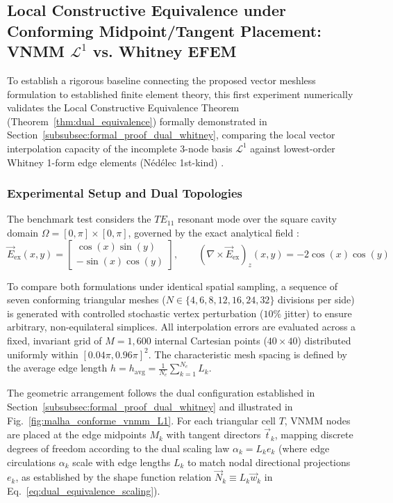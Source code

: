 \documentclass[preprint,12pt]{elsarticle}
\begin{document}
\subsection{Local Constructive Equivalence under Conforming Midpoint/Tangent Placement: VNMM \texorpdfstring{$\mathcal{L}^1$}{L1} vs. Whitney EFEM}
\label{subsec:conforming_dual_equivalence}

To establish a rigorous baseline connecting the proposed vector meshless formulation to established finite element theory, this first experiment numerically validates the Local Constructive Equivalence Theorem (Theorem~\ref{thm:dual_equivalence}) formally demonstrated in Section~\ref{subsubsec:formal_proof_dual_whitney}, comparing the local vector interpolation capacity of the incomplete 3-node basis $\mathcal{L}^1$ against lowest-order Whitney 1-form edge elements (N\'ed\'elec 1st-kind) \cite{nedelec1980mixed, monk2003finite, boffi2013mixed}.

\subsubsection{Experimental Setup and Dual Topologies}
The benchmark test considers the $TE_{11}$ resonant mode over the square cavity domain $\Omega = [0, \pi] \times [0, \pi]$, governed by the exact analytical field \cite{harrington2001time, jin2014finite}:
\begin{equation}
    \vec{E}_{\mathrm{ex}}(x, y) = \begin{bmatrix} \cos(x) \sin(y) \\[2pt] -\sin(x) \cos(y) \end{bmatrix}, \qquad (\nabla \times \vec{E}_{\mathrm{ex}})_z(x, y) = -2 \cos(x) \cos(y)
    \label{eq:analytical_te11_field}
\end{equation}

To compare both formulations under identical spatial sampling, a sequence of seven conforming triangular meshes ($N \in \{4, 6, 8, 12, 16, 24, 32\}$ divisions per side) is generated with controlled stochastic vertex perturbation ($10\%$ jitter) to ensure arbitrary, non-equilateral simplices. All interpolation errors are evaluated across a fixed, invariant grid of $M = 1{,}600$ internal Cartesian points ($40 \times 40$) distributed uniformly within $[0.04\pi, 0.96\pi]^2$. The characteristic mesh spacing is defined by the average edge length $h = h_{\mathrm{avg}} = \frac{1}{N_e}\sum_{k=1}^{N_e} L_k$.

The geometric arrangement follows the dual configuration established in Section~\ref{subsubsec:formal_proof_dual_whitney} and illustrated in Fig.~\ref{fig:malha_conforme_vnmm_L1}. For each triangular cell $T$, VNMM nodes are placed at the edge midpoints $M_k$ with tangent directors $\vec{t}_k$, mapping discrete degrees of freedom according to the dual scaling law $\alpha_k = L_k e_k$ (where edge circulations $\alpha_k$ scale with edge lengths $L_k$ to match nodal directional projections $e_k$, as established by the shape function relation $\vec{N}_k \equiv L_k \vec{w}_k$ in Eq.~\eqref{eq:dual_equivalence_scaling}).
\end{document}
